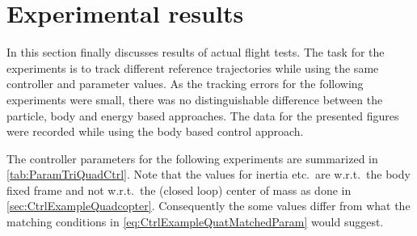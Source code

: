 \section{Experimental results}
In this section finally discusses results of actual flight tests.
The task for the experiments is to track different reference trajectories while using the same controller and parameter values.
As the tracking errors for the following experiments were small, there was no distinguishable difference between the particle, body and energy based approaches.
The data for the presented figures were recorded while using the body based control approach.

The controller parameters for the following experiments are summarized in \autoref{tab:ParamTriQuadCtrl}.
Note that the values for inertia etc.\ are w.r.t.\ the body fixed frame and not w.r.t.\ the (closed loop) center of mass as done in \autoref{sec:CtrlExampleQuadcopter}.
Consequently the some values differ from what the matching conditions in \eqref{eq:CtrlExampleQuatMatchedParam} would suggest.

